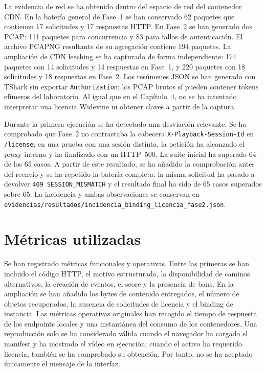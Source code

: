 La evidencia de red se ha obtenido dentro del espacio de red del contenedor CDN. En la batería general de Fase~1 se han conservado 62 paquetes que contienen 17 solicitudes y 17 respuestas HTTP. En Fase~2 se han generado dos PCAP: 111 paquetes para concurrencia y 83 para fallos de autenticación. El archivo PCAPNG resultante de su agregación contiene 194 paquetes. La ampliación de CDN leeching se ha capturado de forma independiente: 174 paquetes con 14 solicitudes y 14 respuestas en Fase~1, y 220 paquetes con 18 solicitudes y 18 respuestas en Fase~2. Los resúmenes JSON se han generado con TShark sin exportar \nolinkurl{Authorization}; los PCAP brutos sí pueden contener tokens efímeros del laboratorio. Al igual que en el Capítulo~4, no se ha intentado interpretar una licencia Widevine ni obtener claves a partir de la captura.

Durante la primera ejecución se ha detectado una desviación relevante. Se ha comprobado que Fase~2 no contrastaba la cabecera \nolinkurl{X-Playback-Session-Id} en \nolinkurl{/license}; en una prueba con una sesión distinta, la petición ha alcanzado el proxy interno y ha finalizado con un HTTP~500. La suite inicial ha superado 64 de los 65 casos. A partir de este resultado, se ha añadido la comprobación antes del reenvío y se ha repetido la batería completa: la misma solicitud ha pasado a devolver \nolinkurl{409 SESSION_MISMATCH} y el resultado final ha sido de 65 casos superados sobre 65. La incidencia y ambas observaciones se conservan en \nolinkurl{evidencias/resultados/incidencia_binding_licencia_fase2.json}.

\section{Métricas utilizadas}

Se han registrado métricas funcionales y operativas. Entre las primeras se han incluido el código HTTP, el motivo estructurado, la disponibilidad de caminos alternativos, la creación de eventos, el score y la presencia de bans. En la ampliación se han añadido los bytes de contenido entregados, el número de objetos recuperados, la ausencia de solicitudes de licencia y el binding de instancia. Las métricas operativas originales han recogido el tiempo de respuesta de los endpoints locales y una instantánea del consumo de los contenedores. Una reproducción solo se ha considerado válida cuando el navegador ha cargado el manifest y ha mostrado el vídeo en ejecución; cuando el activo ha requerido licencia, también se ha comprobado su obtención. Por tanto, no se ha aceptado únicamente el mensaje de la interfaz.


